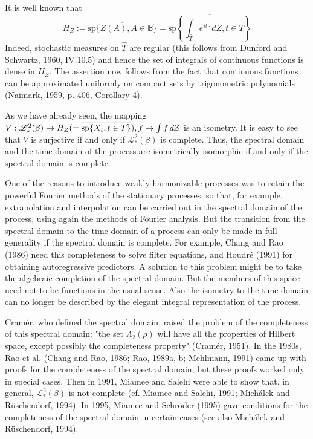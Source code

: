 \documentclass{article}
\newcommand{\assign}{:=}
\begin{document}
It is well known that
\begin{equation}
  H_Z \assign \overline{\mathrm{sp} \{Z (A), A \in \mathbb{B}\}} =
  \overline{\mathrm{sp} \left\{ \int_{\hat{T}} e^{it \cdot} dZ, t \in T
  \right\}}
\end{equation}
Indeed, stochastic measures on $\hat{T}$ are regular (this follows from
Dunford and Schwartz, 1960, IV.10.5) and hence the set of integrals of
continuous functions is dense in $H_Z$. The assertion now follows from the
fact that continuous functions can be approximated uniformly on compact sets
by trigonometric polynomials (Naimark, 1959, p. 406, Corollary 4).

As we have already seen, the mapping $V : \mathscr{L}_{\ast}^2 (\beta) \to H_Z
(= \overline{\mathrm{sp} \{X_t, t \in T\}}), f \mapsto \int f \hspace{0.17em}
dZ$ is an isometry. It is easy to see that $V$ is surjective if and only if
$\mathscr{L}_{\ast}^2 (\beta)$ is complete. Thus, the spectral domain and the
time domain of the process are isometrically isomorphic if and only if the
spectral domain is complete.

One of the reasons to introduce weakly harmonizable processes was to retain
the powerful Fourier methods of the stationary processes, so that, for
example, extrapolation and interpolation can be carried out in the spectral
domain of the process, using again the methods of Fourier analysis. But the
transition from the spectral domain to the time domain of a process can only
be made in full generality if the spectral domain is complete. For example,
Chang and Rao (1986) need this completeness to solve filter equations, and
Houdr{\'e} (1991) for obtaining autoregressive predictors. A solution to this
problem might be to take the algebraic completion of the spectral domain. But
the members of this space need not to be functions in the usual sense. Also
the isometry to the time domain can no longer be described by the elegant
integral representation of the process.

Cram{\'e}r, who defined the spectral domain, raised the problem of the
completeness of this spectral domain: "the set $\Lambda_2 (\rho)$ will have
all the properties of Hilbert space, except possibly the completeness
property" (Cram{\'e}r, 1951). In the 1980s, Rao et al. (Chang and Rao, 1986;
Rao, 1989a, b; Mehlmann, 1991) came up with proofs for the completeness of the
spectral domain, but these proofs worked only in special cases. Then in 1991,
Miamee and Salehi were able to show that, in general, $\mathscr{L}_{\ast}^2
(\beta)$ is not complete (cf. Miamee and Salehi, 1991; Mich{\'a}lek and
R{\"u}schendorf, 1994). In 1995, Miamee and Schr{\"o}der (1995) gave
conditions for the completeness of the spectral domain in certain cases (see
also Mich{\'a}lek and R{\"u}schendorf, 1994).
\end{document}
